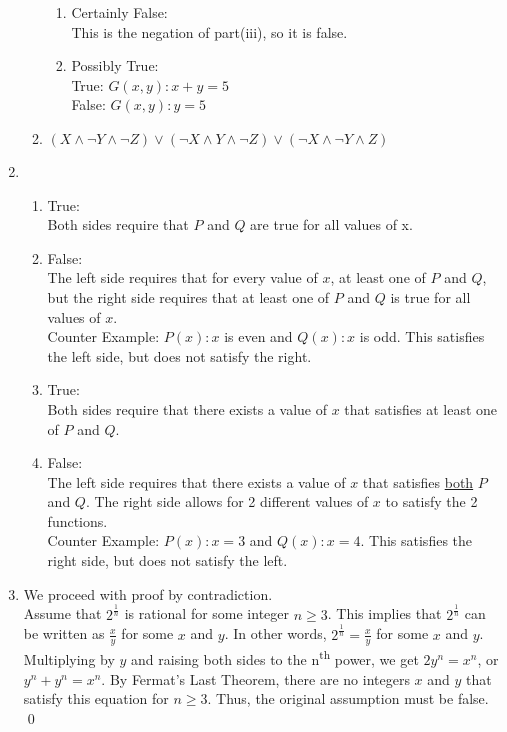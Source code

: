 \documentclass[a4paper]{article}
\newcommand{\<}{\langle}
\renewcommand{\>}{\rangle}
\renewcommand{\^}{\wedge}
\renewcommand{\v}{\vee}
\begin{document}
\begin{enumerate}
\begin{enumerate}
\begin{enumerate}
                    \item Certainly False:\\
                        This is the negation of part(iii), so it is false.
                    \item Possibly True:\\
                        True: $G(x,y): x + y = 5$\\
                        False: $G(x,y): y = 5$
                \end{enumerate}
            \item
                $(X \^ \neg Y \^ \neg Z) \v (\neg X \^ Y \^ \neg Z) \v (\neg X \^ \neg Y \^ Z)$
        \end{enumerate}
    \item
        \begin{enumerate}
            \item True:\\
            Both sides require that $P$ and $Q$ are true for all values of x.
            \item False:\\
            The left side requires that for every value of $x$, at least one of $P$ and $Q$, but the right side requires that at least one of $P$ and $Q$ is true for all values of $x$.\\
            Counter Example: $P(x): x$ is even and $Q(x): x$ is odd. This satisfies the left side, but does not satisfy the right.
            \item True:\\
            Both sides require that there exists a value of $x$ that satisfies at least one of $P$ and $Q$.
            \item False:\\
            The left side requires that there exists a value of $x$ that satisfies \underline{both} $P$ and $Q$. The right side allows for 2 different values of $x$ to satisfy the 2 functions.\\
            Counter Example: $P(x): x = 3$ and $Q(x): x = 4$. This satisfies the right side, but does not satisfy the left.
        \end{enumerate}
    \item
        We proceed with proof by contradiction.\\
        Assume that $2^\frac{1}{n}$ is rational for some integer $n \geq 3$. This implies that $2^\frac{1}{n}$ can be written as $\frac{x}{y}$ for some $x$ and $y$. In other words, $2^\frac{1}{n} = \frac{x}{y}$ for some $x$ and $y$. Multiplying by $y$ and raising both sides to the n\textsuperscript{th} power, we get $2y^n = x^n$, or $y^n + y^n = x^n$. By Fermat's Last Theorem, there are no integers $x$ and $y$ that satisfy this equation for $n \geq 3$. Thus, the original assumption must be false. \qed

\end{enumerate}
\end{document}
